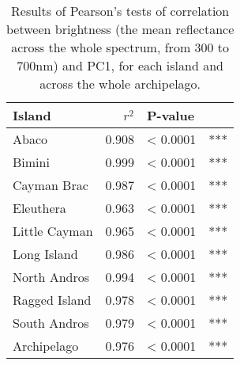 \begin{table}[H]
    \caption{Results of Pearson's tests of correlation between brightness (the mean reflectance across the whole spectrum, from 300 to 700nm) and PC1, for each island and across the whole archipelago.}
    \centering
    \begin{tabular}{lrll}
        \hline
        Island & $r^2$ & P-value & \\
        \hline
        Abaco & 0.908 & < 0.0001 & ***\\
        Bimini & 0.999 & < 0.0001 & ***\\
        Cayman Brac & 0.987 & < 0.0001 & ***\\
        Eleuthera & 0.963 & < 0.0001 & ***\\
        Little Cayman & 0.965 & < 0.0001 & ***\\
        Long Island & 0.986 & < 0.0001 & ***\\
        North Andros & 0.994 & < 0.0001 & ***\\
        Ragged Island & 0.978 & < 0.0001 & ***\\
        South Andros & 0.979 & < 0.0001 & ***\\
        Archipelago & 0.976 & < 0.0001 & ***\\
        \hline
    \end{tabular}
    \label{suptab:brightness}
\end{table}
